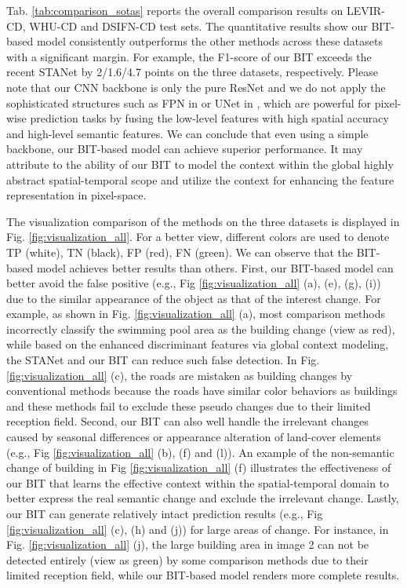 \documentclass[journal]{IEEEtran}
\begin{document}
Tab. \ref{tab:comparison_sotas} reports the overall comparison results on LEVIR-CD, WHU-CD and DSIFN-CD test sets. The quantitative results show our BIT-based model consistently outperforms the other methods across these datasets with a significant margin. For example, the F1-score of our BIT exceeds the recent STANet by 2/1.6/4.7 points on the three datasets, respectively. Please note that our CNN backbone is only the pure ResNet and we do not apply the sophisticated structures such as FPN in \cite{Chen2020e} or UNet in \cite{Daudt2018, Liu2019b, Zhang2020b, Fang2021}, which are powerful for pixel-wise prediction tasks by fusing the low-level features with high spatial accuracy and high-level semantic features. We can conclude that even using a simple backbone, our BIT-based model can achieve superior performance. It may attribute to the ability of our BIT to model the context within the global highly abstract spatial-temporal scope and utilize the context for enhancing the feature representation in pixel-space.

The visualization comparison of the methods on the three datasets is displayed in Fig. \ref{fig:visualization_all}. For a better view, different colors are used to denote TP (white), TN (black), FP (red), FN (green). We can observe that the BIT-based model achieves better results than others. First, our BIT-based model can better avoid the false positive (e.g., Fig \ref{fig:visualization_all} (a), (e), (g), (i)) due to the similar appearance of the object as that of the interest change. For example, as shown in Fig. \ref{fig:visualization_all} (a), most comparison methods incorrectly classify the swimming pool area as the building change (view as red), while based on the enhanced discriminant features via global context modeling, the STANet and our BIT can reduce such false detection. In Fig. \ref{fig:visualization_all} (c), the roads are mistaken as building changes by conventional methods because the roads have similar color behaviors as buildings and these methods fail to exclude these pseudo changes due to their limited reception field. Second, our BIT can also well handle the irrelevant changes caused by seasonal differences or appearance alteration of land-cover elements (e.g., Fig \ref{fig:visualization_all} (b), (f) and (l)). An example of the non-semantic change of building in Fig \ref{fig:visualization_all} (f) illustrates the effectiveness of our BIT that learns the effective context within the spatial-temporal domain to better express the real semantic change and exclude the irrelevant change. Lastly, our BIT can generate relatively intact prediction results (e.g., Fig \ref{fig:visualization_all} (c), (h) and (j)) for large areas of change. For instance, in Fig. \ref{fig:visualization_all} (j), the large building area in image 2 can not be detected entirely (view as green) by some comparison methods due to their limited reception field, while our BIT-based model renders more complete results.
\end{document}
